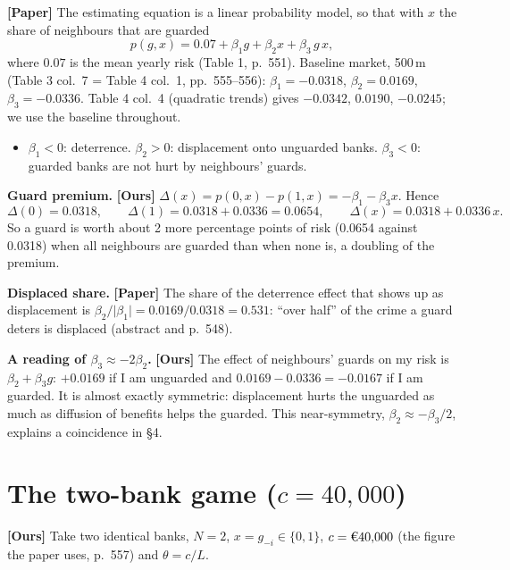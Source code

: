 \documentclass[11pt,a4paper]{article}
\newcommand{\eur}{\texteuro{}}
\newcommand{\paper}{\textbf{[Paper]}}
\newcommand{\ours}{\textbf{[Ours]}}
\newcommand{\Dl}{\Delta}
\begin{document}
\paper{} The estimating equation is a linear probability model, so that with $x$ the share of
neighbours that are guarded
\[
  p(g,x) = 0.07 + \beta_1 g + \beta_2 x + \beta_3\, g\,x,
\]
where $0.07$ is the mean yearly risk (Table 1, p.\ 551). Baseline market, 500\,m (Table 3 col.\ 7 =
Table 4 col.\ 1, pp.\ 555--556): $\beta_1=-0.0318$, $\beta_2=0.0169$, $\beta_3=-0.0336$. Table 4 col.\ 4
(quadratic trends) gives $-0.0342$, $0.0190$, $-0.0245$; we use the baseline throughout.
\begin{itemize}
  \item $\beta_1<0$: deterrence. $\beta_2>0$: displacement onto unguarded banks. $\beta_3<0$: guarded
        banks are not hurt by neighbours' guards.
\end{itemize}
\textbf{Guard premium.} \ours{} $\Dl(x)=p(0,x)-p(1,x)=-\beta_1-\beta_3 x$. Hence
\[
  \Dl(0)=0.0318,\qquad \Dl(1)=0.0318+0.0336=0.0654,\qquad \Dl(x)=0.0318+0.0336\,x .
\]
So a guard is worth about 2 more percentage points of risk (0.0654 against 0.0318) when all neighbours
are guarded than when none is, a doubling of the premium.

\textbf{Displaced share.} \paper{} The share of the deterrence effect that shows up as displacement is
$\beta_2/\lvert\beta_1\rvert=0.0169/0.0318=0.531$: ``over half'' of the crime a guard deters is displaced
(abstract and p.\ 548).

\textbf{A reading of $\beta_3\approx-2\beta_2$.} \ours{} The effect of neighbours' guards on my risk is
$\beta_2+\beta_3 g$: $+0.0169$ if I am unguarded and $0.0169-0.0336=-0.0167$ if I am guarded. It is
almost exactly symmetric: displacement hurts the unguarded as much as diffusion of benefits helps the
guarded. This near-symmetry, $\beta_2\approx-\beta_3/2$, explains a coincidence in \S4.

\section{The two-bank game ($c=40{,}000$)}

\ours{} Take two identical banks, $N=2$, $x=g_{-i}\in\{0,1\}$, $c=\text{\eur}40{,}000$ (the figure the paper
uses, p.\ 557) and $\theta=c/L$.
\end{document}

